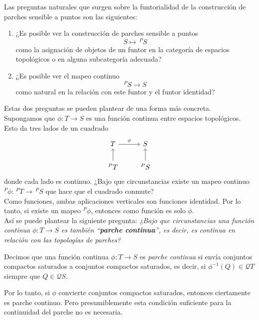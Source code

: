 Las preguntas naturales que surgen sobre la funtorialidad de la construcción de parches sensible a puntos son las siguientes:

\begin{enumerate}
    \item ¿Es posible ver la construcción de parches sensible a puntos 
    \[
    S\mapsto\, ^PS
    \]
    como la asignación de objetos de un funtor en la categoría de espacios topológicos o en alguna subcategoría adecuada?

    \item ¿Es posible ver el mapeo continuo 
    \[
    ^PS\to S
    \]
    como natural en la relación con este funtor y el funtor identidad?
\end{enumerate}

Estas dos preguntas se pueden plantear de una forma más concreta.\\

Supongamos que $\phi \colon T\to S$ es una función continua entre espacios topológicos. Esto da tres lados de un cuadrado
\[\begin{tikzcd}
	T & S \\
	{^PT} & {^PS}
	\arrow["\phi", from=1-1, to=1-2]
	\arrow[from=2-1, to=1-1]
	\arrow[from=2-2, to=1-2]
\end{tikzcd}\]
donde cada lado es continuo. ¿Bajo que circunstancias existe un mapeo continuo $^P\phi \colon \,^PT\to \,^PS$ que hace que el cuadrado conmute?\\

Como funciones, ambas aplicaciones verticales son funciones identidad. Por lo tanto, si existe un mapeo $^P\phi$, entonces como función es solo $\phi$.\\

Así se puede plantear la siguiente pregunta: \emph{¿Bajo que circunstancias una función continua $\phi\colon T\to S$ es también ``\textbf{parche continua}'', es decir, es continua en relación con las topologías de parches?}

\begin{dfn}\label{Parchecontinua}
    Decimos que una función continua $\phi\colon T\to S$ es \emph{parche continua} si envía conjuntos compactos saturados a conjuntos compactos saturados, es decir, si $\phi ^{-1}(Q)\in \mathcal{Q}T$ siempre que $Q\in \mathcal{Q}S$. 
\end{dfn}

Por lo tanto, si $\phi$ convierte conjuntos compactos saturados, entonces ciertamente es parche continuo. Pero presumiblemente esta condición suficiente para la continuidad del parche no es necesaria.\\

